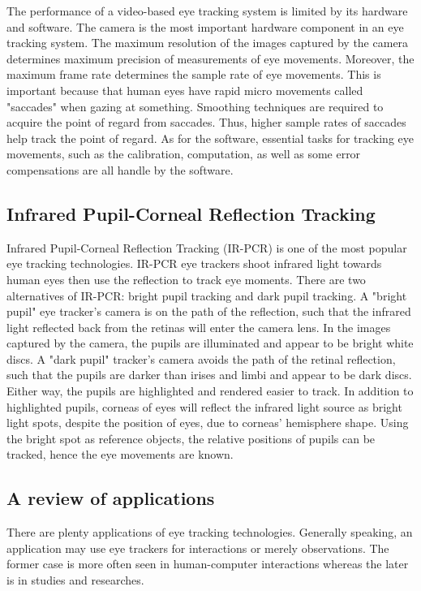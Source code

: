 \documentclass[english]{tktltiki}
\begin{document}
The performance of a video-based eye tracking system is limited by its hardware and software. The camera is the most important hardware component in an eye tracking system. The maximum resolution of the images captured by the camera determines maximum precision of measurements of eye movements. Moreover, the maximum frame rate determines the sample rate of eye movements. This is important because that human eyes have rapid micro movements called "saccades" when gazing at something. Smoothing techniques are required to acquire the point of regard from saccades. Thus, higher sample rates of saccades help track the point of regard. As for the software, essential tasks for tracking eye movements, such as the calibration, computation, as well as some error compensations are all handle by the software. 


\subsection{Infrared Pupil-Corneal Reflection Tracking}

Infrared Pupil-Corneal Reflection Tracking (IR-PCR) is one of the most popular eye tracking technologies. IR-PCR eye trackers shoot infrared light towards human eyes then use the reflection to track eye moments. There are two alternatives of IR-PCR: bright pupil tracking and dark pupil tracking. A "bright pupil" eye tracker's camera is on the path of the reflection, such that the infrared light reflected back from the retinas will enter the camera lens. In the images captured by the camera, the pupils are illuminated and appear to be bright white discs. A "dark pupil" tracker's camera avoids the path of the retinal reflection, such that the pupils are darker than irises and limbi and appear to be dark discs. Either way, the pupils are highlighted and rendered easier to track. In addition to highlighted pupils, corneas of eyes will reflect the infrared light source as bright light spots, despite the position of eyes, due to corneas' hemisphere shape. Using the bright spot as reference objects, the relative positions of pupils can be tracked, hence the eye movements are known.


\subsection{A review of applications}

There are plenty applications of eye tracking technologies. Generally speaking, an application may use eye trackers for interactions or merely observations. The former case is more often seen in human-computer interactions whereas the later is in studies and researches. 
\end{document}
